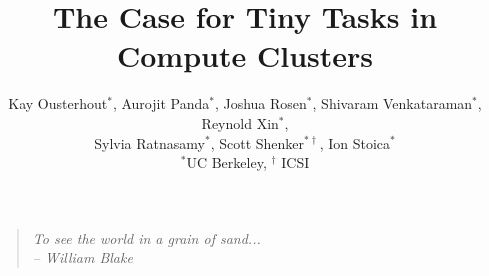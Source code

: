 \documentclass[pdftex,twocolumn,10pt,letterpaper]{article}
\begin{document}
\title{\large \bf The Case for Tiny Tasks in Compute Clusters}
\author{
{\rm Kay Ousterhout$^*$, Aurojit Panda$^*$, Joshua Rosen$^*$, Shivaram Venkataraman$^*$, Reynold Xin$^*$,}\\
\rm{Sylvia Ratnasamy$^*$, Scott Shenker$^{*\dag}$, Ion Stoica$^*$} \\
$^*$UC Berkeley, $^\dag$ ICSI
}
\date{}

\pagestyle{empty}


\maketitle
\vspace{1in}

\begin{quote}
  \textit{To see the world in a grain of sand...}\\
  \textit{-- William Blake}
\end{quote}










\end{document}
